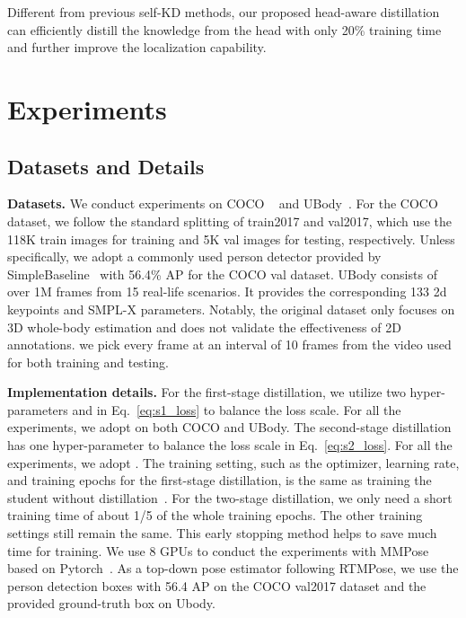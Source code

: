 \documentclass[10pt,twocolumn,letterpaper]{article}
\begin{document}
Different from previous self-KD methods, our proposed head-aware distillation can efficiently distill the knowledge from the head with only 20\% training time and further improve the localization capability.

\section{Experiments}
\label{main experiments}

\subsection{Datasets and Details}
\textbf{Datasets.} We conduct experiments on COCO ~\cite{jin2020whole,lin2014microsoft} and UBody~\cite{lin2023one}. For the COCO dataset, we follow the standard splitting of
train2017 and val2017, which use the 118K train images for training and 5K val images for testing, respectively. Unless specifically, we adopt a commonly used person detector provided by SimpleBaseline~\cite{xiao2018simple} with 56.4\% AP for the COCO val dataset. UBody consists of over 1M frames from 15 real-life scenarios. It provides the corresponding 133 2d keypoints and SMPL-X parameters. Notably, the original dataset only focuses on 3D whole-body estimation and does not validate the effectiveness of 2D annotations. we pick every frame at an interval of 10 frames from the video used for both training and testing. 

\textbf{Implementation details.} For the first-stage distillation, we utilize two hyper-parameters  and  in Eq.~\ref{eq:s1_loss} to balance the loss scale. For all the experiments, we adopt  on both COCO and UBody. The second-stage distillation has one hyper-parameter  to balance the loss scale in Eq.~\ref{eq:s2_loss}. For all the experiments, we adopt .
The training setting, such as the optimizer, learning rate, and training epochs for the first-stage distillation, is the same as training the student without distillation~\cite{jiang2023rtmpose}. For the two-stage distillation, we only need a short training time of about 1/5 of the whole training epochs. The other training settings still remain the same. This early stopping method helps to save much time for training. We use 8 GPUs to conduct the experiments with MMPose~\cite{mmpose2020} based on Pytorch~\cite{paszke2019pytorch}.
As a top-down pose estimator following RTMPose, we use the person detection boxes with 56.4 AP on the COCO val2017 dataset and the provided ground-truth box on Ubody.
\end{document}
